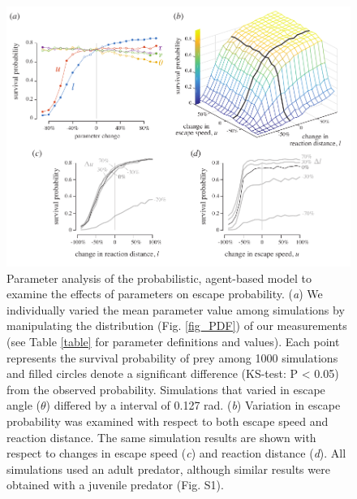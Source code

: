\documentclass[]{rsos}%
\begin{document}
\begin{figure}[!h]
\centering
	\includegraphics[width=5.5in]{fig_sensitivity}
\caption{Parameter analysis of the probabilistic, agent-based model to examine the effects of parameters on escape probability.   
(\textit{a}) We individually varied the mean parameter value among simulations by manipulating the distribution (Fig. \ref{fig_PDF}) of our measurements (see Table \ref{table} for parameter definitions and values). 
Each point represents the survival probability of prey among 1000 simulations and filled circles denote a significant difference (KS-test: P < 0.05) from the observed probability.
Simulations that varied in escape angle ($\theta$) differed by a interval of 0.127 rad.
(\textit{b}) Variation in escape probability was examined with respect to both escape speed and reaction distance.
The same simulation results are shown with respect to changes in escape speed (\textit{c}) and reaction distance (\textit{d}). All simulations used an adult predator, although similar results were obtained with a juvenile predator (Fig. S1).
}
\label{fig_sense}
\end{figure}

\pagebreak
\end{document}
